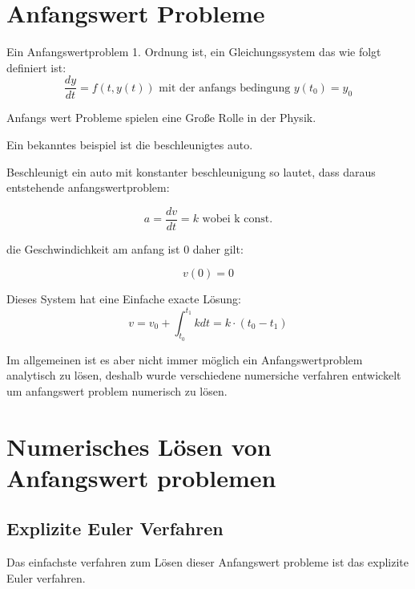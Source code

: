 

\section{Anfangswert Probleme}



Ein Anfangswertproblem 1. Ordnung ist, ein Gleichungssystem das wie folgt definiert ist:
$$
\frac{dy}{dt} = f(t, y(t)) \text{ mit der anfangs bedingung } y(t_0) = y_0
$$

Anfangs wert Probleme spielen eine Große Rolle in der Physik.

Ein bekanntes beispiel ist die beschleunigtes auto.

Beschleunigt ein auto mit konstanter beschleunigung so lautet, dass daraus entstehende anfangswertproblem:

$$
a = \frac{dv}{dt} = k \text{ wobei k const.}
$$

die Geschwindichkeit am anfang ist 0 daher gilt:

$$
v(0) = 0
$$

Dieses System hat eine Einfache exacte Lösung:
$$
v = v_0 + \int_{t_0}^{t_1} k dt = k \cdot (t_0 - t_1) 
$$

Im allgemeinen ist es aber nicht immer möglich ein Anfangswertproblem analytisch zu lösen, deshalb wurde verschiedene numersiche verfahren entwickelt um anfangswert problem numerisch zu lösen.

\section{Numerisches Lösen von Anfangswert problemen}

\subsection{Explizite Euler Verfahren}


Das einfachste verfahren zum Lösen dieser Anfangswert probleme ist das explizite Euler verfahren.

